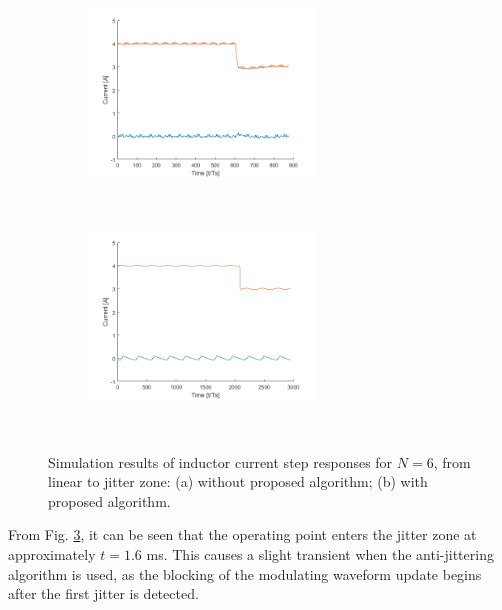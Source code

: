 \documentclass[journal]{IEEEtran}
\begin{document}
\begin{figure}[t!]
\centering
\begin{subfigure}{0.5\textwidth}
  \centering
  \includegraphics[width=0.95\linewidth, height = 45mm]{figures/nasDif_step_3Rs.png}
  \caption{}
  \label{fig:step_simulation_sub1}
\end{subfigure}\\
\begin{subfigure}{0.5\textwidth}
  \centering
  \includegraphics[width=0.95\linewidth, height = 45mm]{figures/nasDif_step_50Hz.png}
  \caption{}
  \label{fig:step_simulation_sub2}
\end{subfigure}\\
\caption{Simulation results of inductor current step responses for $N=6$, from linear to jitter zone: (a) without proposed algorithm; (b) with proposed algorithm.}
\label{fig:step_simulation}
\end{figure}
\noindent
From Fig. \ref{fig:step_simulation}, it can be seen that the operating point enters the jitter zone at approximately $t = 1.6$ ms. This causes a slight transient when the anti-jittering algorithm is used, as the blocking of the modulating waveform update begins after the first jitter is detected.
\end{document}
